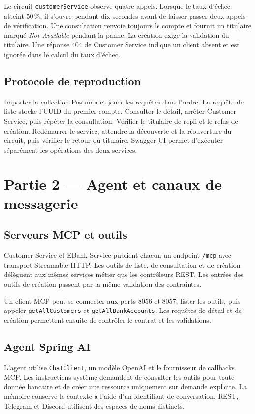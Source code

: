 \documentclass[11pt,a4paper]{article}
\newcommand{\code}[1]{\texttt{#1}}
\newcommand{\panne}{\textit{Not Available}}
\begin{document}
Le circuit \code{customerService} observe quatre appels. Lorsque le taux d'échec atteint 50\,\%, il s'ouvre pendant dix secondes avant de laisser passer deux appels de vérification. Une consultation renvoie toujours le compte et fournit un titulaire marqué \panne{} pendant la panne. La création exige la validation du titulaire. Une réponse 404 de Customer Service indique un client absent et est ignorée dans le calcul du taux d'échec.

\subsection{Protocole de reproduction}
Importer la collection Postman et jouer les requêtes dans l'ordre. La requête de liste stocke l'UUID du premier compte. Consulter le détail, arrêter Customer Service, puis répéter la consultation. Vérifier le titulaire de repli et le refus de création. Redémarrer le service, attendre la découverte et la réouverture du circuit, puis vérifier le retour du titulaire. Swagger UI permet d'exécuter séparément les opérations des deux services.

\clearpage
\section{Partie 2 — Agent et canaux de messagerie}
\subsection{Serveurs MCP et outils}
Customer Service et EBank Service publient chacun un endpoint \code{/mcp} avec transport Streamable HTTP. Les outils de liste, de consultation et de création délèguent aux mêmes services métier que les contrôleurs REST. Les entrées des outils de création passent par la même validation des contraintes.

Un client MCP peut se connecter aux ports 8056 et 8057, lister les outils, puis appeler \code{getAllCustomers} et \code{getAllBankAccounts}. Les requêtes de détail et de création permettent ensuite de contrôler le contrat et les validations.

\subsection{Agent Spring AI}
L'agent utilise \code{ChatClient}, un modèle OpenAI et le fournisseur de callbacks MCP. Les instructions système demandent de consulter les outils pour toute donnée bancaire et de créer une ressource uniquement sur demande explicite. La mémoire conserve le contexte à l'aide d'un identifiant de conversation. REST, Telegram et Discord utilisent des espaces de noms distincts.
\end{document}
